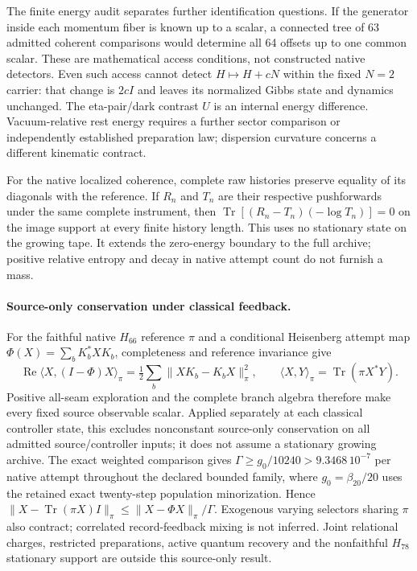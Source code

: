 The finite energy audit separates further identification questions. If
the generator inside each momentum fiber is known up to a scalar, a
connected tree of 63 admitted coherent comparisons would determine all
64 offsets up to one common scalar. These are mathematical access conditions,
not constructed native detectors. Even such access cannot detect $H\mapsto
H+cN$ within the fixed $N=2$ carrier: that change is $2cI$ and leaves its
normalized Gibbs state and dynamics unchanged. The eta-pair/dark contrast
$U$ is an internal energy difference. Vacuum-relative rest energy
requires a further sector comparison or independently established preparation
law; dispersion curvature concerns a different kinematic contract.

For the native localized coherence, complete raw histories preserve equality
of its diagonals with the reference. If $R_n$ and $T_n$ are their respective
pushforwards under the same complete instrument, then
$\operatorname{Tr}[(R_n-T_n)(-\log T_n)]=0$ on the image support at every
finite history length. This uses no stationary state on the growing tape.
It extends the zero-energy boundary to the full archive; positive relative
entropy and decay in native attempt count do not furnish a mass.

\paragraph{Source-only conservation under classical feedback.}
For the faithful native $H_{66}$ reference $\pi$ and a conditional
Heisenberg attempt map $\Phi(X)=\sum_bK_b^*XK_b$, completeness and reference
invariance give
\[
 \operatorname{Re}\langle X,(I-\Phi)X\rangle_\pi
 =\tfrac12\sum_b\|XK_b-K_bX\|_\pi^2,
 \qquad \langle X,Y\rangle_\pi=\operatorname{Tr}(\pi X^*Y).
\]
Positive all-seam exploration and the complete branch algebra therefore
make every fixed source observable scalar. Applied separately at each
classical controller state, this excludes nonconstant source-only
conservation on all admitted source/controller inputs; it does not assume
a stationary growing archive. The exact weighted comparison gives
$\Gamma\ge g_0/10240>9.3468\,10^{-7}$ per native attempt throughout the
declared bounded family, where $g_0=\beta_{20}/20$ uses the retained exact
twenty-step population minorization. Hence
$\|X-\operatorname{Tr}(\pi X)I\|_\pi\le
\|X-\Phi X\|_\pi/\Gamma$.
Exogenous varying selectors sharing $\pi$ also contract; correlated
record-feedback mixing is not inferred. Joint relational charges,
restricted preparations, active quantum recovery and the nonfaithful
$H_{78}$ stationary support are outside this source-only result.
